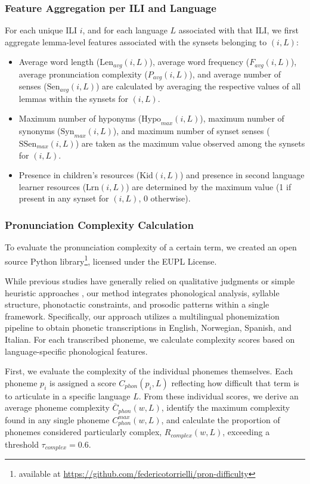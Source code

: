 \documentclass[preprint,12pt,authoryear]{elsarticle}
\begin{document}
\subsubsection{Feature Aggregation per ILI and Language}
For each unique ILI $i$, and for each language $L$ associated with that ILI, we first aggregate lemma-level features associated with the synsets belonging to $(i, L)$:
\begin{itemize}
    \item Average word length ($\text{Len}_{avg}(i, L)$), average word frequency ($F_{avg}(i, L)$), average pronunciation complexity ($P_{avg}(i, L)$), and average number of senses ($\text{Sen}_{avg}(i, L)$) are calculated by averaging the respective values of all lemmas within the synsets for $(i, L)$.
    \item Maximum number of hyponyms ($\text{Hypo}_{max}(i, L)$), maximum number of synonyms ($\text{Syn}_{max}(i, L)$), and maximum number of synset senses ($\text{SSen}_{max}(i, L)$) are taken as the maximum value observed among the synsets for $(i, L)$.
    \item Presence in children's resources ($\text{Kid}(i, L)$) and presence in second language learner resources ($\text{Lrn}(i, L)$) are determined by the maximum value (1 if present in any synset for $(i, L)$, 0 otherwise).
\end{itemize}

\subsubsection{Pronunciation Complexity Calculation}
\label{sec:pron_complex}

To evaluate the pronunciation complexity of a certain term, we created an open source Python library\footnote{available at \url{https://github.com/federicotorrielli/pron-difficulty}}, licensed under the EUPL License.

While previous studies have generally relied on qualitative judgments or simple heuristic approaches \cite{chen_word_2015,pennington_assessing_2018}, our method integrates phonological analysis, syllable structure, phonotactic constraints, and prosodic patterns within a single framework.
Specifically, our approach utilizes a multilingual phonemization pipeline to obtain phonetic transcriptions in English, Norwegian, Spanish, and Italian. For each transcribed phoneme, we calculate complexity scores based on language-specific phonological features.

First, we evaluate the complexity of the individual phonemes themselves. Each phoneme $p_i$ is assigned a score $C_{phon}(p_i,L)$ reflecting how difficult that term is to articulate in a specific language $L$. From these individual scores, we derive an average phoneme complexity $\bar{C}_{phon}(w,L)$, identify the maximum complexity found in any single phoneme $C_{phon}^{max}(w,L)$, and calculate the proportion of phonemes considered particularly complex, $R_{complex}(w,L)$, exceeding a threshold $\tau_{complex}=0.6$.
\end{document}
